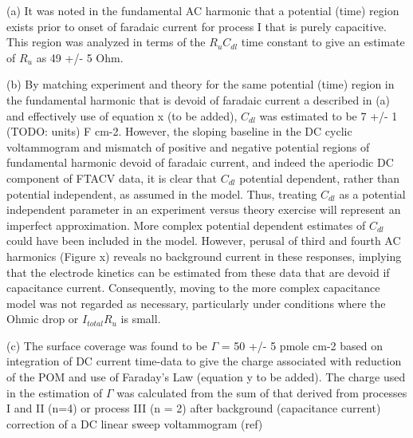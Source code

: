 \documentclass[a4paper, 12pt]{article}
\begin{document}
(a) It was noted in the fundamental AC harmonic that a potential (time) region 
exists prior to onset of faradaic current for process I that is purely 
capacitive.  This region was analyzed in terms of the $R_u  C_{dl}$ time constant to 
give an estimate of $R_u$ as 49 +/- 5 Ohm. 

(b) By matching experiment and theory  for the same potential (time) region in 
the fundamental  harmonic that is devoid of faradaic current a described in (a) 
and effectively use of equation x (to be added), $C_{dl}$ was estimated to be 7 
+/- 1 (TODO: units) F cm-2. However, the sloping baseline in  the DC cyclic 
voltammogram and mismatch of positive and negative potential regions of 
fundamental harmonic devoid of faradaic current, and indeed the aperiodic DC 
component of FTACV data, it is clear that $C_{dl}$  potential dependent, rather 
than potential independent, as assumed in the model. Thus, treating $C_{dl}$ as a 
potential independent parameter in an experiment versus theory exercise will 
represent an imperfect approximation.  More complex potential dependent 
estimates of $C_{dl}$ could have been included in the model. However, perusal of 
third and fourth AC harmonics (Figure x) reveals no background current in these 
responses, implying that the electrode kinetics can be estimated from these data 
that are devoid if capacitance current.  Consequently, moving to the more 
complex capacitance model was not regarded as necessary, particularly under 
conditions where the Ohmic drop or $I_{total} R_u$ is small.

(c) The surface coverage was found to be $\Gamma$ = 50 +/- 5 pmole cm-2 based on 
integration of DC current time-data to give the charge associated with reduction 
of the POM and use of Faraday’s Law (equation y to be added). The charge used in 
the estimation of $\Gamma$ was calculated from the sum of that derived from 
processes I and II (n=4) or process   III (n = 2) after   background 
(capacitance current) correction of a DC linear sweep voltammogram (ref)
\end{document}
